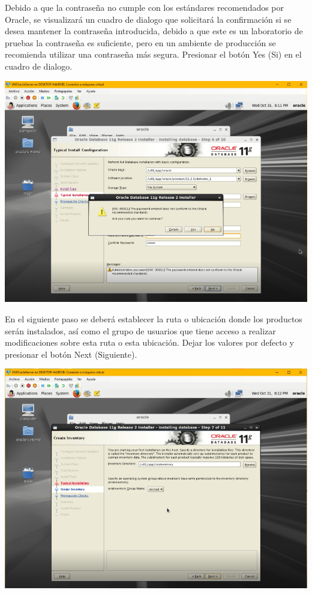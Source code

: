 \vspace{\baselineskip}

Debido a que la contraseña no cumple con los estándares recomendados por Oracle, se visualizará un cuadro de dialogo que solicitará la confirmación si se desea mantener la contraseña introducida, debido a que este es un laboratorio de pruebas la contraseña es suficiente, pero en un ambiente de producción se recomienda utilizar una contraseña más segura. Presionar el botón Yes (Si) en el cuadro de dialogo.
\begin{center}
	\includegraphics[width=14cm]{./Imagenes/77} 
\end{center}

\vspace{\baselineskip}

En el siguiente paso se deberá establecer la ruta o ubicación donde los productos serán instalados, así como el grupo de usuarios que tiene acceso a realizar modificaciones sobre esta ruta o esta ubicación. Dejar los valores por defecto y presionar el botón Next (Siguiente).
\begin{center}
	\includegraphics[width=16cm]{./Imagenes/78} 
\end{center}

